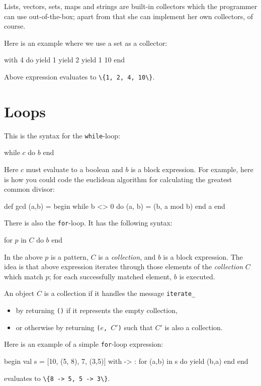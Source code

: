 \documentclass[11pt]{amsart}
\newcommand{\babelsrc}[1] {\lstinline!#1!}
\begin{document}
Lists, vectors, sets, maps and strings are built-in collectors which the programmer can use out-of-the-box; apart from that she can implement her own collectors, of course.

Here is an example where we use a set as a collector:
\begin{babellisting}
with {4} do
  yield 1
  yield 2
  yield 1
  10
end
\end{babellisting}
Above expression evaluates to \babelsrc{\{1, 2, 4, 10\}}.

\section{Loops}\label{sec:loops}
This is the syntax for the \babelsrc{while}-loop:
\begin{babellisting}
while $c$ do
  $b$
end
\end{babellisting}
Here $c$ must evaluate to a boolean and $b$ is a block expression. For example, here is how you could code the euclidean algorithm for calculating the greatest common divisor:
\begin{babellisting}
def gcd (a,b) = begin
  while b <> 0 do
    (a, b) = (b, a mod b)
  end
  a
end
\end{babellisting}

There is also the \babelsrc{for}-loop. It has the following syntax:
\begin{babellisting}
for $p$ in $C$ do
  $b$
end
\end{babellisting}
In the above $p$ is a pattern, $C$ is a \emph{collection}, and $b$ is a block expression.
The idea is that above expression iterates through those elements of the \emph{collection} $C$ 
which match $p$; for each successfully matched element, $b$ is executed. 

An object $C$ is a collection if it handles the message \texttt{iterate\_}
\begin{itemize}
\item by returning \texttt{()} if it represents the empty collection,
\item or otherwise by returning \texttt{($e$, $C'$)} such that $C'$ is also a collection.
\end{itemize}

Here is an example of a simple \babelsrc{for}-loop expression:
\begin{babellisting}
begin
  val s = [10, (5, 8), 7, (3,5)]
  with {->} : for (a,b) in s do
    yield (b,a)
  end
end
\end{babellisting}
evaluates to \babelsrc{\{8 -> 5, 5 -> 3\}}.
\end{document}
